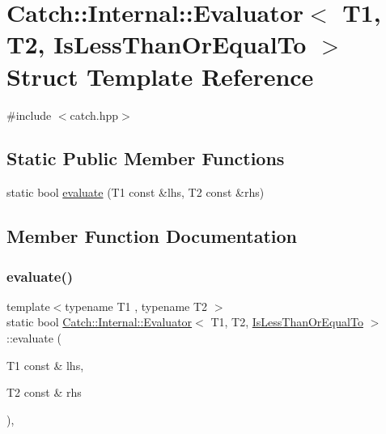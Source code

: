 \hypertarget{struct_catch_1_1_internal_1_1_evaluator_3_01_t1_00_01_t2_00_01_is_less_than_or_equal_to_01_4}{}\section{Catch\+:\+:Internal\+:\+:Evaluator$<$ T1, T2, Is\+Less\+Than\+Or\+Equal\+To $>$ Struct Template Reference}
\label{struct_catch_1_1_internal_1_1_evaluator_3_01_t1_00_01_t2_00_01_is_less_than_or_equal_to_01_4}


{\ttfamily \#include $<$catch.\+hpp$>$}

\subsection*{Static Public Member Functions}
\begin{DoxyCompactItemize}
\item 
static bool \hyperlink{struct_catch_1_1_internal_1_1_evaluator_3_01_t1_00_01_t2_00_01_is_less_than_or_equal_to_01_4_adf269a597e4d82d69f29bcb516297b9b}{evaluate} (T1 const \&lhs, T2 const \&rhs)
\end{DoxyCompactItemize}


\subsection{Member Function Documentation}
\hypertarget{struct_catch_1_1_internal_1_1_evaluator_3_01_t1_00_01_t2_00_01_is_less_than_or_equal_to_01_4_adf269a597e4d82d69f29bcb516297b9b}{}\label{struct_catch_1_1_internal_1_1_evaluator_3_01_t1_00_01_t2_00_01_is_less_than_or_equal_to_01_4_adf269a597e4d82d69f29bcb516297b9b} 
\subsubsection{\texorpdfstring{evaluate()}{evaluate()}}
{\footnotesize\ttfamily template$<$typename T1 , typename T2 $>$ \\
static bool \hyperlink{class_catch_1_1_internal_1_1_evaluator}{Catch\+::\+Internal\+::\+Evaluator}$<$ T1, T2, \hyperlink{namespace_catch_1_1_internal_ae3f96598a7858155750bf38e7295d83ea0db29a4c3f1e81260036c5e27a8407fd}{Is\+Less\+Than\+Or\+Equal\+To} $>$\+::evaluate (\begin{DoxyParamCaption}\item[{T1 const \&}]{lhs,  }\item[{T2 const \&}]{rhs }\end{DoxyParamCaption})\hspace{0.3cm}{\ttfamily [inline]}, {\ttfamily [static]}}

